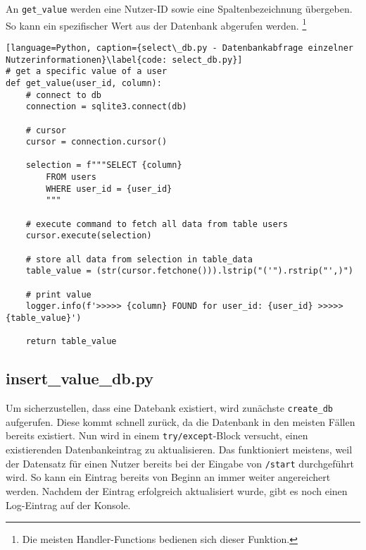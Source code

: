                 An \verb|get_value| werden eine Nutzer-ID sowie eine Spaltenbezeichnung übergeben. So kann ein spezifischer Wert aus der Datenbank abgerufen werden. \footnote{Die meisten Handler-Functions bedienen sich dieser Funktion.} 
                \begin{lstlisting}[language=Python, caption={select\_db.py - Datenbankabfrage einzelner Nutzerinformationen}\label{code: select_db.py}]
# get a specific value of a user
def get_value(user_id, column):
    # connect to db
    connection = sqlite3.connect(db)

    # cursor
    cursor = connection.cursor()

    selection = f"""SELECT {column}
        FROM users
        WHERE user_id = {user_id}
        """

    # execute command to fetch all data from table users
    cursor.execute(selection)

    # store all data from selection in table_data
    table_value = (str(cursor.fetchone())).lstrip("('").rstrip("',)")

    # print value
    logger.info(f'>>>>> {column} FOUND for user_id: {user_id} >>>>> {table_value}')

    return table_value
                \end{lstlisting}

        \subsection{insert\_value\_db.py} \label{insert_value_db.py}
                Um sicherzustellen, dass eine Datebank existiert, wird zunächste \verb|create_db| aufgerufen. Diese kommt schnell zurück, da die Datenbank in den meisten Fällen bereits existiert. Nun wird in einem \verb|try/except|-Block versucht, einen existierenden Datenbankeintrag zu aktualisieren. Das funktioniert meistens, weil der Datensatz für einen Nutzer bereits bei der Eingabe von \verb|/start| durchgeführt wird. So kann ein Eintrag bereits von Beginn an immer weiter angereichert werden. Nachdem der Eintrag erfolgreich aktualisiert wurde, gibt es noch einen Log-Eintrag auf der Konsole.

